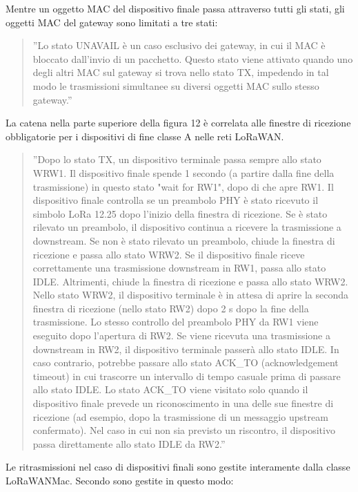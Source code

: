 \documentclass[a4paper]{report} %
\begin{document}
Mentre un oggetto MAC del dispositivo finale passa attraverso tutti gli stati, gli oggetti MAC del gateway sono limitati a tre stati:
\begin{quote}
	''Lo stato UNAVAIL è un caso esclusivo dei gateway, in cui il MAC è bloccato dall'invio di un pacchetto. Questo stato viene attivato quando uno degli altri MAC sul gateway si trova nello stato TX, impedendo in tal modo le trasmissioni simultanee su diversi oggetti MAC sullo stesso gateway.'' 
\end{quote}	
La catena nella parte superiore della figura 12 è correlata alle finestre di ricezione obbligatorie per i dispositivi di fine classe A nelle reti LoRaWAN. 
\begin{quote}
	''Dopo lo stato TX, un dispositivo terminale passa sempre allo stato WRW1. Il dispositivo finale spende 1 secondo (a partire dalla fine della trasmissione) in questo stato "wait for RW1", dopo di che apre RW1. Il dispositivo finale controlla se un preambolo PHY è stato ricevuto il simbolo LoRa 12.25 dopo l'inizio della finestra di ricezione. Se è stato rilevato un preambolo, il dispositivo continua a ricevere la trasmissione a downstream.	Se non è stato rilevato un preambolo, chiude la finestra di ricezione e passa allo stato WRW2. Se il dispositivo finale riceve correttamente una trasmissione downstream in RW1, passa allo stato IDLE. Altrimenti, chiude la finestra di ricezione e passa allo stato WRW2. Nello stato WRW2, il dispositivo terminale è in attesa di aprire la seconda finestra di ricezione (nello stato RW2) dopo 2 s dopo la fine della trasmissione. Lo stesso controllo del preambolo PHY da RW1 viene eseguito dopo l'apertura di RW2. Se viene ricevuta una trasmissione a downstream in RW2, il dispositivo terminale passerà allo stato IDLE. In caso contrario, potrebbe passare allo stato ACK\_TO (acknowledgement timeout) in cui trascorre un intervallo di tempo casuale prima di passare allo stato IDLE. Lo stato ACK\_TO viene visitato solo quando il dispositivo finale prevede un riconoscimento in una delle sue finestre di ricezione (ad esempio, dopo la trasmissione di un messaggio upstream confermato). Nel caso in cui non sia previsto un riscontro, il dispositivo passa direttamente allo stato IDLE da RW2.'' 
\end{quote}	
Le ritrasmissioni nel caso di dispositivi finali sono gestite interamente dalla classe LoRaWANMac. Secondo \cite{art:rif.49} sono gestite in questo modo:
\end{document}
